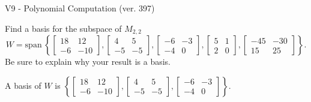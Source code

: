 \begin{exercise}
  \begin{exerciseTitle}V9 - Polynomial Computation (ver. 397)\end{exerciseTitle}
  \begin{exerciseStatement}
    Find a basis for the subspace of \(M_{2,2}\) 
\[W=\mathrm{span}\ \left\{\left[\begin{array}{cc}
18 & 12 \\
-6 & -10
\end{array}\right] , \left[\begin{array}{cc}
4 & 5 \\
-5 & -5
\end{array}\right] , \left[\begin{array}{cc}
-6 & -3 \\
-4 & 0
\end{array}\right] , \left[\begin{array}{cc}
5 & 1 \\
2 & 0
\end{array}\right] , \left[\begin{array}{cc}
-45 & -30 \\
15 & 25
\end{array}\right]\right\}.\]
 Be sure to explain why your result is a basis.


  \end{exerciseStatement}
  \begin{exerciseAnswer}
   A basis of \(W\) is  \(\left\{\left[\begin{array}{cc}
18 & 12 \\
-6 & -10
\end{array}\right] , \left[\begin{array}{cc}
4 & 5 \\
-5 & -5
\end{array}\right] , \left[\begin{array}{cc}
-6 & -3 \\
-4 & 0
\end{array}\right]\right\}\).
  


  \end{exerciseAnswer}
\end{exercise}